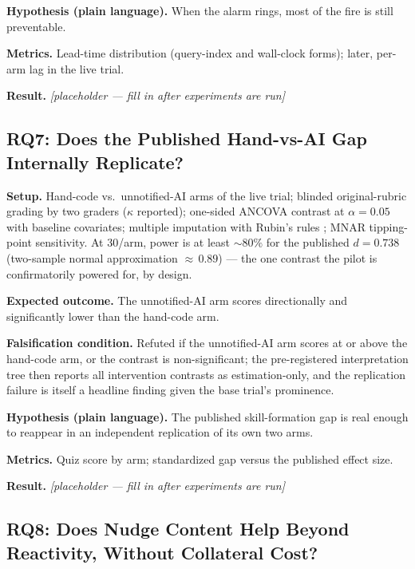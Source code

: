 \documentclass[11pt]{article}
\begin{document}
\textbf{Hypothesis (plain language).} When the alarm rings, most of the fire is still preventable.

\textbf{Metrics.} Lead-time distribution (query-index and wall-clock forms); later, per-arm lag in the live trial.

\textbf{Result.} \emph{[placeholder --- fill in after experiments are run]}

\subsection{RQ7: Does the Published Hand-vs-AI Gap Internally Replicate?}

\textbf{Setup.} Hand-code vs.\ unnotified-AI arms of the live trial; blinded original-rubric grading by two graders ($\kappa$ reported); one-sided ANCOVA contrast at $\alpha = 0.05$ with baseline covariates; multiple imputation with Rubin's rules \citep{rubin1987multiple}; MNAR tipping-point sensitivity. At 30/arm, power is at least ${\sim}80\%$ for the published $d = 0.738$ (two-sample normal approximation ${\approx}\,0.89$) --- the one contrast the pilot is confirmatorily powered for, by design.

\textbf{Expected outcome.} The unnotified-AI arm scores directionally and significantly lower than the hand-code arm.

\textbf{Falsification condition.} Refuted if the unnotified-AI arm scores at or above the hand-code arm, or the contrast is non-significant; the pre-registered interpretation tree then reports all intervention contrasts as estimation-only, and the replication failure is itself a headline finding given the base trial's prominence.

\textbf{Hypothesis (plain language).} The published skill-formation gap is real enough to reappear in an independent replication of its own two arms.

\textbf{Metrics.} Quiz score by arm; standardized gap versus the published effect size.

\textbf{Result.} \emph{[placeholder --- fill in after experiments are run]}

\subsection{RQ8: Does Nudge Content Help Beyond Reactivity, Without Collateral Cost?}
\end{document}
